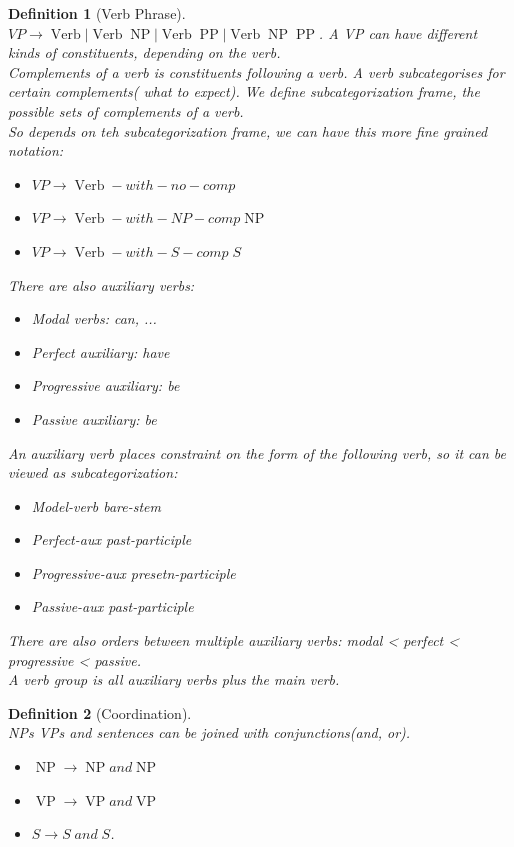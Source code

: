 \documentclass[12pt]{article}
\newtheorem{definition}{Definition}[section]
\theoremstyle{definition}
\DeclareMathOperator{\NP}{NP}
\DeclareMathOperator{\VP}{VP}
\DeclareMathOperator{\PP}{PP}
\DeclareMathOperator{\Verb}{Verb}
\begin{document}
\begin{definition}[Verb Phrase]
\hfill\\\normalfont $VP\to \Verb | \Verb \NP | \Verb \PP | \Verb \NP \PP$.
A VP can have different kinds of constituents, depending on the verb.\\
Complements of a verb is constituents following a verb. A verb subcategorises for certain complements( what to expect). We define subcategorization frame, the possible sets of complements of a verb.\\
So depends on teh subcategorization frame, we can have this more fine grained notation:
\begin{itemize}
	\item $VP\to \Verb-with-no-comp$
	\item $VP \to \Verb-with-NP-comp \NP$
	\item $VP\to \Verb-with-S-comp\;S$
\end{itemize}
There are also auxiliary verbs:
\begin{itemize}
	\item Modal verbs: can, ...
	\item Perfect auxiliary: have
	\item Progressive auxiliary: be
	\item Passive auxiliary: be
\end{itemize}
An auxiliary verb places constraint on the form of the following verb, so it can be viewed as subcategorization:
\begin{itemize}
	\item Model-verb bare-stem
	\item Perfect-aux past-participle
	\item Progressive-aux presetn-participle
	\item Passive-aux past-participle
\end{itemize}
There are also orders between multiple auxiliary verbs: modal < perfect < progressive < passive.\\
A verb group is all auxiliary verbs plus the main verb.
\end{definition}
\begin{definition}[Coordination]
\hfill\\\normalfont NPs VPs and sentences can be joined with conjunctions(and, or).
\begin{itemize}
	\item $\NP\to \NP and \NP$
	\item $\VP \to \VP and \VP$
	\item $S\to S\;and\;S$.
\end{itemize}
\end{definition}
\end{document}

